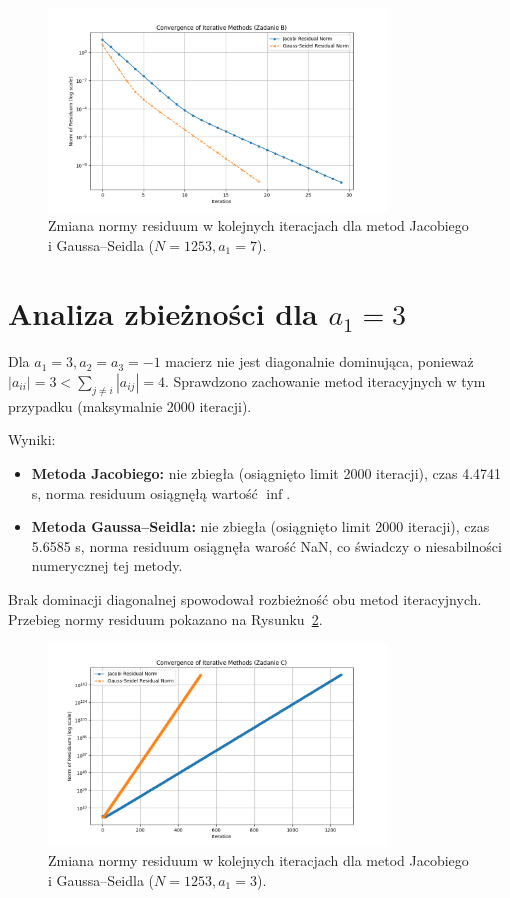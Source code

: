 \documentclass[a4paper, 11pt]{article}
\begin{document}
\begin{figure}[H]
    \centering
    \includegraphics[width=0.8\textwidth]{residuals_plot_B}
    \caption{Zmiana normy residuum w kolejnych iteracjach dla metod Jacobiego i Gaussa–Seidla ($N=1253, a_1=7$).}
    \label{fig:task_b_convergence}
\end{figure}

\section{Analiza zbieżności dla $a_1 = 3$}
Dla $a_1=3, a_2=a_3=-1$ macierz nie jest diagonalnie dominująca, ponieważ $|a_{ii}| = 3 < \sum_{j\neq i} |a_{ij}| = 4$. Sprawdzono zachowanie metod iteracyjnych w tym przypadku (maksymalnie 2000 iteracji).

Wyniki:
\begin{itemize}
    \item \textbf{Metoda Jacobiego:} nie zbiegła (osiągnięto limit 2000 iteracji), czas \num{4.4741} s, norma residuum osiągnęłą wartość $\inf$.
    \item \textbf{Metoda Gaussa–Seidla:} nie zbiegła (osiągnięto limit 2000 iteracji), czas \num{5.6585} s, norma residuum osiągnęła warość NaN, co świadczy o niesabilności numerycznej tej metody.
\end{itemize}
Brak dominacji diagonalnej spowodował rozbieżność obu metod iteracyjnych. Przebieg normy residuum pokazano na Rysunku~\ref{fig:task_c_convergence}.

\begin{figure}[H]
    \centering
    \includegraphics[width=0.8\textwidth]{residuals_plot_C}
    \caption{Zmiana normy residuum w kolejnych iteracjach dla metod Jacobiego i Gaussa–Seidla ($N=1253, a_1=3$).}
    \label{fig:task_c_convergence}
\end{figure}
\end{document}
